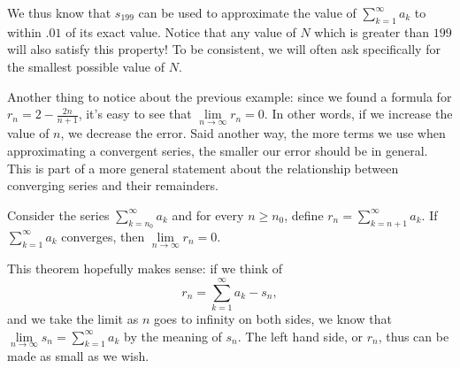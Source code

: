 \documentclass{ximera}
\begin{document}
\begin{example}
\begin{explanation}
\begin{enumerate}
We thus know that $s_{199}$ can be used to approximate the value of $\sum_{k=1}^{\infty} a_k$ to within $.01$ of its exact value.  Notice that any value of $N$ which is greater than $199$ will also satisfy this property!  To be consistent, we will often ask specifically for the smallest possible value of $N$.
\end{enumerate}
\end{explanation}

\end{example}

Another thing to notice about the previous example: since we found a formula for $r_n = 2 - \frac{2n}{n+1}$, it's easy to see that $\lim \limits_{n \to \infty} r_n = 0$. In other words, if we increase the value of $n$, we decrease the error.  Said another way, the more terms we use when approximating a convergent series, the smaller our error should be in general.  This is part of a more general statement about the relationship between converging series and their remainders.

\begin{theorem}
Consider the series $\sum_{k=n_0}^{\infty} a_k$ and for every $n \geq n_0$, define $r_n = \sum_{k=n+1}^{\infty} a_k$.  If $\sum \limits_{k=1}^\infty a_k$ converges, then $\lim \limits_{n \to \infty} r_n = 0$.   
\end{theorem}

This theorem hopefully makes sense: if we think of 
\[
r_n = \sum \limits_{k=1}^\infty a_k - s_n,
\]
and we take the limit as $n$ goes to infinity on both sides, we know that $\lim \limits_{n \to \infty} s_n = \sum \limits_{k=1}^\infty a_k$ by the meaning of $s_n$.  The left hand side, or $r_n$, thus can be made as small as we wish.
\end{document}
